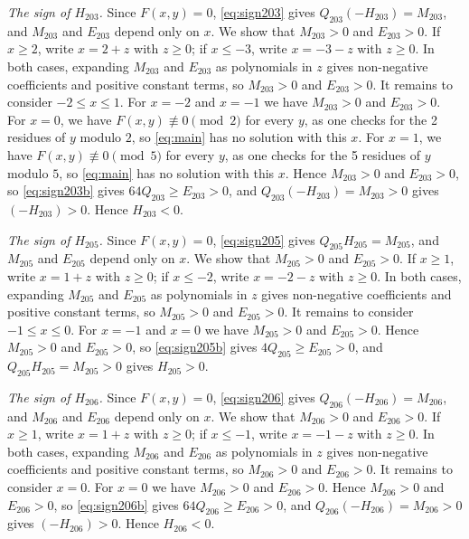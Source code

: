 \documentclass[11pt]{article}
\begin{document}
\emph{The sign of $H_{203}$.} Since $F(x,y)=0$, \eqref{eq:sign203} gives $Q_{203}(-H_{203})=M_{203}$, and $M_{203}$ and $E_{203}$ depend only on $x$. We show that $M_{203}>0$ and $E_{203}>0$. If $x\geq2$, write $x=2+z$ with $z\geq0$; if $x\leq-3$, write $x=-3-z$ with $z\geq0$. In both cases, expanding $M_{203}$ and $E_{203}$ as polynomials in $z$ gives non-negative coefficients and positive constant terms, so $M_{203}>0$ and $E_{203}>0$. It remains to consider $-2\leq x\leq1$. For $x=-2$ and $x=-1$ we have $M_{203}>0$ and $E_{203}>0$. For $x=0$, we have $F(x,y)\not\equiv0\pmod{2}$ for every $y$, as one checks for the 2 residues of $y$ modulo $2$, so \eqref{eq:main} has no solution with this $x$. For $x=1$, we have $F(x,y)\not\equiv0\pmod{5}$ for every $y$, as one checks for the 5 residues of $y$ modulo $5$, so \eqref{eq:main} has no solution with this $x$. Hence $M_{203}>0$ and $E_{203}>0$, so \eqref{eq:sign203b} gives $64Q_{203}\geq E_{203}>0$, and $Q_{203}(-H_{203})=M_{203}>0$ gives $(-H_{203})>0$. Hence $H_{203}<0$.

\emph{The sign of $H_{205}$.} Since $F(x,y)=0$, \eqref{eq:sign205} gives $Q_{205}H_{205}=M_{205}$, and $M_{205}$ and $E_{205}$ depend only on $x$. We show that $M_{205}>0$ and $E_{205}>0$. If $x\geq1$, write $x=1+z$ with $z\geq0$; if $x\leq-2$, write $x=-2-z$ with $z\geq0$. In both cases, expanding $M_{205}$ and $E_{205}$ as polynomials in $z$ gives non-negative coefficients and positive constant terms, so $M_{205}>0$ and $E_{205}>0$. It remains to consider $-1\leq x\leq0$. For $x=-1$ and $x=0$ we have $M_{205}>0$ and $E_{205}>0$. Hence $M_{205}>0$ and $E_{205}>0$, so \eqref{eq:sign205b} gives $4Q_{205}\geq E_{205}>0$, and $Q_{205}H_{205}=M_{205}>0$ gives $H_{205}>0$.

\emph{The sign of $H_{206}$.} Since $F(x,y)=0$, \eqref{eq:sign206} gives $Q_{206}(-H_{206})=M_{206}$, and $M_{206}$ and $E_{206}$ depend only on $x$. We show that $M_{206}>0$ and $E_{206}>0$. If $x\geq1$, write $x=1+z$ with $z\geq0$; if $x\leq-1$, write $x=-1-z$ with $z\geq0$. In both cases, expanding $M_{206}$ and $E_{206}$ as polynomials in $z$ gives non-negative coefficients and positive constant terms, so $M_{206}>0$ and $E_{206}>0$. It remains to consider $x=0$. For $x=0$ we have $M_{206}>0$ and $E_{206}>0$. Hence $M_{206}>0$ and $E_{206}>0$, so \eqref{eq:sign206b} gives $64Q_{206}\geq E_{206}>0$, and $Q_{206}(-H_{206})=M_{206}>0$ gives $(-H_{206})>0$. Hence $H_{206}<0$.
\end{document}

